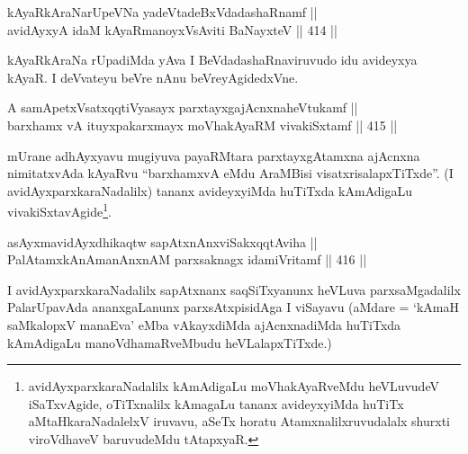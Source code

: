 
\begin{shl}
kAyaRkAraNarUpeVNa yadeVtadeBxVdadashaRnamf || \\
avidAyxyA idaM kAyaRmanoyxV\s sAviti BaNayxteV \hfill || 414 ||  
\end{shl}

\begin{artha}
kAyaRkAraNa rUpadiMda yAva I BeVdadashaRnaviruvudo idu avideyxya kAyaR.
I deVvateyu beVre nAnu beVreyAgidedxVne.
\end{artha}


\begin{shl}
A samApetxVsatxqqtiVyasayx parxtayxgajAcnxnaheVtukamf || \\
barxhamx vA ituyxpakarxmayx moVhakAyaRM vivakiSxtamf \hfill || 415 ||  
\end{shl}

\begin{artha}
mUrane adhAyxyavu mugiyuva payaRMtara parxtayxgAtamxna ajAcnxna
nimitatxvAda kAyaRvu ``barxhamxvA eMdu AraMBisi
visatxrisalapxTiTxde''. (I avidAyxparxkaraNadalilx) tananx
avideyxyiMda huTiTxda kAmAdigaLu
vivakiSxtavAgide\footnote{avidAyxparxkaraNadalilx kAmAdigaLu
moVhakAyaRveMdu heVLuvudeV iSaTxvAgide, oTiTxnalilx kAmagaLu tananx
avideyxyiMda huTiTx aMtaHkaraNadalelxV iruvavu, aSeTx horatu
Atamxnalilxruvudalalx shurxti viroVdhaveV baruvudeMdu tAtapxyaR.}. 
\end{artha}

\begin{shl}
asAyxmavidAyxdhikaqtw sapAtxnAnxviSakxqqtAviha || \\
PalAtamxkAnAmanAnxnAM parxsaknagx idamiVritamf \hfill || 416 ||  
\end{shl}

\begin{artha}
I avidAyxparxkaraNadalilx sapAtxnanx saqSiTxyanunx heVLuva
parxsaMgadalilx PalarUpavAda ananxgaLanunx parxsAtxpisidAga I viSayavu
(aMdare = `kAmaH saMkalopxV \mdash   manaEva' eMba vAkayxdiMda
ajAcnxnadiMda huTiTxda kAmAdigaLu manoVdhamaRveMbudu heVLalapxTiTxde.)
\end{artha}


